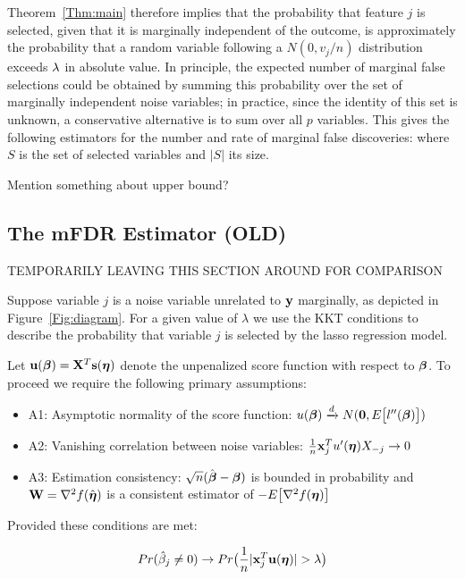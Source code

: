 Theorem~\ref{Thm:main} therefore implies that the probability that feature $j$ is selected, given that it is marginally independent of the outcome, is approximately the probability that a random variable following a $N(0, v_j/n)$ distribution exceeds $\lambda$ in absolute value.
In principle, the expected number of marginal false selections could be obtained by summing this probability over the set of marginally independent noise variables; in practice, since the identity of this set is unknown, a conservative alternative is to sum over all $p$ variables.
This gives the following estimators for the number and rate of marginal false discoveries:
where $S$ is the set of selected variables and $|S|$ its size.

Mention something about upper bound?

\subsection{The mFDR Estimator (OLD)}

TEMPORARILY LEAVING THIS SECTION AROUND FOR COMPARISON

Suppose variable $j$ is a noise variable unrelated to $\mathbf{y}$ marginally, as depicted in Figure~\ref{Fig:diagram}. For a given value of $\lambda$ we use the KKT conditions to describe the probability that variable $j$ is selected by the lasso regression model.

Let $\mathbf{u}(\boldsymbol{\beta}) = \mathbf{X}^T \mathbf{s}(\boldsymbol{\eta})$ denote the unpenalized score function with respect to $\boldsymbol{\beta}$.  To proceed we require the following primary assumptions:

\begin{itemize}
\item A1: Asymptotic normality of the score function: $u(\boldsymbol{\beta}) \xrightarrow{d} N(\mathbf{0},  E\big[l''(\boldsymbol{\beta})\big])$
\item A2: Vanishing correlation between noise variables: $\frac{1}{n}\mathbf{x}_j^T u'(\boldsymbol{\eta})X_{-j} \rightarrow 0$
\item A3: Estimation consistency: $\sqrt{n}(\hat{\boldsymbol{\beta}}-  \boldsymbol{\beta})$ is bounded in probability and $\mathbf{W} = \nabla^2 f(\hat{\boldsymbol{\eta}})$ is a consistent estimator of $-E\big[\nabla^2 f(\boldsymbol{\eta})\big]$
\end{itemize}

 Provided these conditions are met:

\begin{equation}
Pr(\hat{\beta}_j \neq 0)  \rightarrow Pr\big(\frac{1}{n}|\mathbf{x}_{j}^T \mathbf{u}(\boldsymbol{\eta})| > \lambda\big)
\end{equation}


